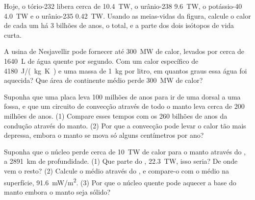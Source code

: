 \begin{exercise}[$\star\star\star$]\label{exo:g12:internal-heat:12}
Hoje, o tório-232 libera cerca de \qty{10.4}{TW}, o urânio-238
\qty{9.6}{TW}, o potássio-40 \qty{4.0}{TW} e o urânio-235 \qty{0.42}{TW}.
Usando as meias-vidas da figura, calcule o calor de cada um há 3 bilhões de
anos, o total, e a parte dos dois isótopos de vida curta.
\end{exercise}

\begin{exercise}[$\star\star\star$]\label{exo:g12:internal-heat:13}
A usina de Nesjavellir pode fornecer até \qty{300}{MW} de calor, levados por
cerca de \qty{1640}{L} de água quente por segundo. Com um calor específico
de \qty{4180}{J/(kg.K)} e uma massa de \qty{1}{kg} por litro, em quantos
graus essa água foi aquecida? Que área de continente médio perde
\qty{300}{MW} de calor?
\end{exercise}

\begin{exercise}[$\star\star\star$]\label{exo:g12:internal-heat:14}
Suponha que uma placa leva 100 milhões de anos para ir de uma dorsal a uma
fossa, e que um circuito de convecção através de todo o manto leva cerca de
200 milhões de anos. (1) Compare esses tempos com os 260 bilhões de anos da
condução através do manto. (2) Por que a convecção pode levar o calor tão
mais depressa, embora o manto se mova só alguns centímetros por ano?
\end{exercise}

\begin{exercise}[$\star\star\star$]\label{exo:g12:internal-heat:15}
Suponha que o núcleo perde cerca de \qty{10}{TW} de calor para o manto
através do , a \qty{2891}{km} de profundidade. (1) Que
parte do , \qty{22.3}{TW}, isso seria? De onde vem o
resto? (2) Calcule o  médio através do ,
e compare-o com o  médio na superfície,
\qty{91.6}{mW/m^2}. (3) Por que o núcleo quente pode aquecer a base do manto
embora o manto seja sólido?
\end{exercise}

